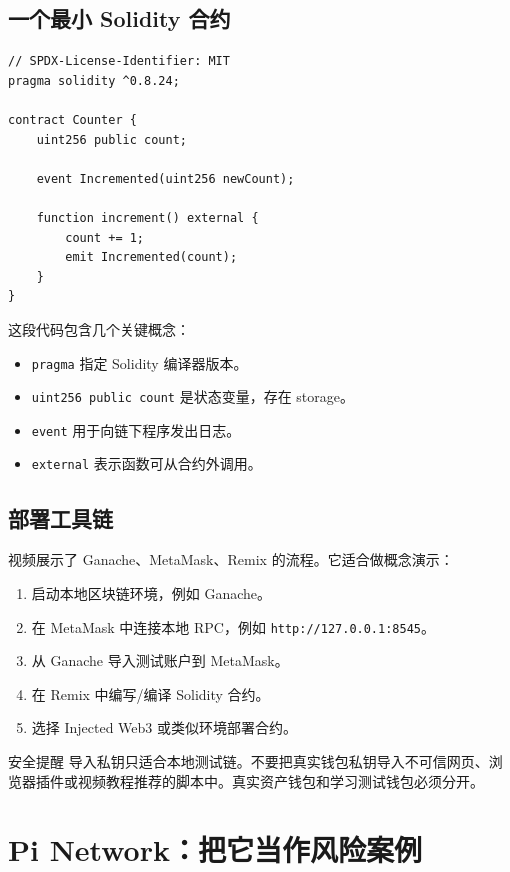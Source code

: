 \documentclass[UTF8,11pt]{ctexart}
\begin{document}
\subsection{一个最小 Solidity 合约}

\begin{verbatim}
// SPDX-License-Identifier: MIT
pragma solidity ^0.8.24;

contract Counter {
    uint256 public count;

    event Incremented(uint256 newCount);

    function increment() external {
        count += 1;
        emit Incremented(count);
    }
}
\end{verbatim}

这段代码包含几个关键概念：
\begin{itemize}
  \item \texttt{pragma} 指定 Solidity 编译器版本。
  \item \texttt{uint256 public count} 是状态变量，存在 storage。
  \item \texttt{event} 用于向链下程序发出日志。
  \item \texttt{external} 表示函数可从合约外调用。
\end{itemize}

\subsection{部署工具链}

视频展示了 Ganache、MetaMask、Remix 的流程。它适合做概念演示：
\begin{enumerate}
  \item 启动本地区块链环境，例如 Ganache。
  \item 在 MetaMask 中连接本地 RPC，例如 \texttt{http://127.0.0.1:8545}。
  \item 从 Ganache 导入测试账户到 MetaMask。
  \item 在 Remix 中编写/编译 Solidity 合约。
  \item 选择 Injected Web3 或类似环境部署合约。
\end{enumerate}

\begin{warnbox}{安全提醒}
导入私钥只适合本地测试链。不要把真实钱包私钥导入不可信网页、浏览器插件或视频教程推荐的脚本中。真实资产钱包和学习测试钱包必须分开。
\end{warnbox}

\section{Pi Network：把它当作风险案例}
\end{document}
